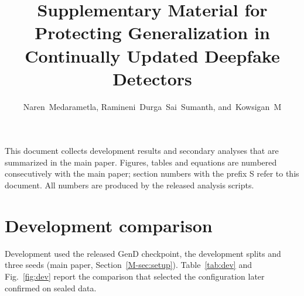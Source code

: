\documentclass[journal]{IEEEtran}
\begin{document}
\title{Supplementary Material for\\ Protecting Generalization in Continually Updated Deepfake Detectors}
\author{Naren~Medarametla, Ramineni~Durga~Sai~Sumanth, and~Kowsigan~M}
\maketitle

This document collects development results and secondary analyses that are summarized in the main paper. Figures, tables and equations are numbered consecutively with the main paper; section numbers with the prefix S refer to this document. All numbers are produced by the released analysis scripts.

\section{Development comparison}
Development used the released GenD checkpoint, the development splits and three seeds (main paper, Section~\ref{M-sec:setup}). Table~\ref{tab:dev} and Fig.~\ref{fig:dev} report the comparison that selected the configuration later confirmed on sealed data.

\begin{table}[t]
\caption{Development results (released GenD, development splits with 8 frames per video, three seeds). FSh: FaceShifter probe AUROC after all updates, mean and [min, max] over seeds.}
\label{tab:dev}
\centering
\footnotesize
\setlength{\tabcolsep}{2.6pt}
\end{table}
\end{document}
